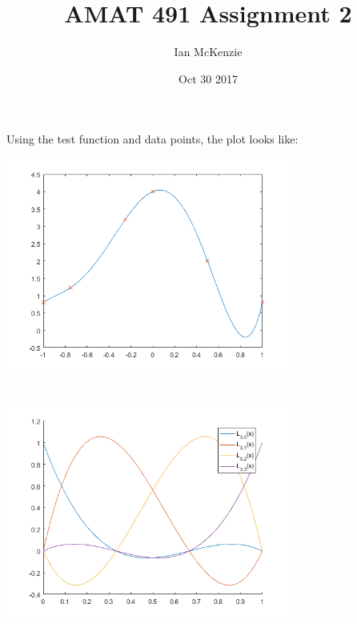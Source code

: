 \documentclass{article}
\title{AMAT 491 Assignment 2}
\date{Oct 30 2017}
\author{Ian McKenzie}
\begin{document}
\maketitle
\newpage
{}

\section{}
Using the test function and data points, the plot looks like:\\
\begin{center}
  \includegraphics[width=0.7\textwidth]{figures/question1}
\end{center}

\section{}
\begin{center}
  \includegraphics[width=0.7\textwidth]{figures/question2}
\end{center}

\section{}
\end{document}
